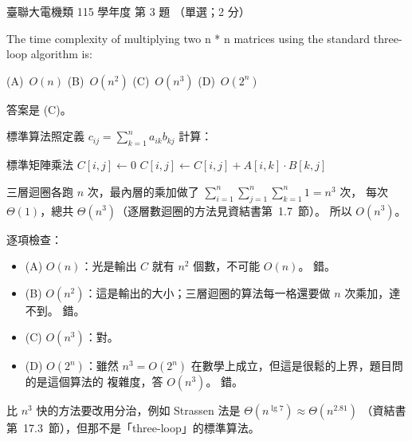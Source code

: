 \begin{pastexam}[label={px:ust-115-ee-ds-03}]{臺聯大電機類 115 學年度 第 3 題}
（單選；2 分）

The time complexity of multiplying two n * n matrices using the standard three-loop algorithm is:

(A)~$O(n)$ \qquad (B)~$O(n^2)$ \qquad (C)~$O(n^3)$ \qquad (D)~$O(2^n)$
\end{pastexam}

\begin{pastsoln}
答案是 (C)。

標準算法照定義 $c_{ij} = \sum_{k=1}^{n} a_{ik} b_{kj}$ 計算：
\begin{pseudo}{標準矩陣乘法}
        \State $C[i, j] \gets 0$
            \State $C[i, j] \gets C[i, j] + A[i, k] \cdot B[k, j]$
        \EndFor
    \EndFor
\EndFor
\end{pseudo}
三層迴圈各跑 $n$ 次，最內層的乘加做了 $\sum_{i=1}^{n}\sum_{j=1}^{n}\sum_{k=1}^{n} 1 = n^3$ 次，
每次 $\Theta(1)$，總共 $\Theta(n^3)$（逐層數迴圈的方法見資結書第~1.7~節）。 所以 $O(n^3)$。

逐項檢查：
\begin{itemize}
\item (A) $O(n)$：光是輸出 $C$ 就有 $n^2$ 個數，不可能 $O(n)$。 錯。
\item (B) $O(n^2)$：這是輸出的大小；三層迴圈的算法每一格還要做 $n$ 次乘加，達不到。 錯。
\item (C) $O(n^3)$：對。
\item (D) $O(2^n)$：雖然 $n^3 = O(2^n)$ 在數學上成立，但這是很鬆的上界，題目問的是這個算法的
複雜度，答 $O(n^3)$。 錯。
\end{itemize}
比 $n^3$ 快的方法要改用分治，例如 Strassen 法是 $\Theta(n^{\lg 7}) \approx \Theta(n^{2.81})$
（資結書第~17.3~節），但那不是「three-loop」的標準算法。
\end{pastsoln}
